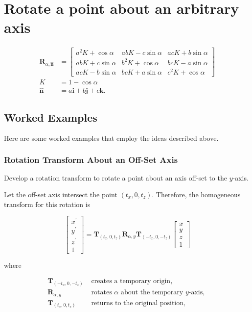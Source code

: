 \documentclass[10pt]{article}
\begin{document}
\section{Rotate a point about an arbitrary axis}
$$
\begin{aligned}
\mathbf{R}_{\alpha, \hat{\mathbf{n}}} & =\left[\begin{array}{ccc}
a^{2} K+\cos \alpha & a b K-c \sin \alpha & a c K+b \sin \alpha \\
a b K+c \sin \alpha & b^{2} K+\cos \alpha & b c K-a \sin \alpha \\
a c K-b \sin \alpha & b c K+a \sin \alpha & c^{2} K+\cos \alpha
\end{array}\right] \\
K & =1-\cos \alpha \\
\hat{\mathbf{n}} & =a \mathbf{i}+b \mathbf{j}+c \mathbf{k} .
\end{aligned}
$$

\subsection{Worked Examples}
Here are some worked examples that employ the ideas described above.

\subsubsection{Rotation Transform About an Off-Set Axis}
Develop a rotation transform to rotate a point about an axis off-set to the $y$-axis.

Let the off-set axis intersect the point $\left(t_{x}, 0, t_{z}\right)$. Therefore, the homogeneous transform for this rotation is

$$
\left[\begin{array}{c}
x^{\prime} \\
y^{\prime} \\
z^{\prime} \\
1
\end{array}\right]=\mathbf{T}_{\left(t_{x}, 0, t_{z}\right)} \mathbf{R}_{\alpha, y} \mathbf{T}_{\left(-t_{x}, 0,-t_{z}\right)}\left[\begin{array}{l}
x \\
y \\
z \\
1
\end{array}\right]
$$

where

$$
\begin{array}{cl}
\mathbf{T}_{\left(-t_{x}, 0,-t_{z}\right)} & \text { creates a temporary origin, } \\
\mathbf{R}_{\alpha, y} & \text { rotates } \alpha \text { about the temporary } y \text {-axis, } \\
\mathbf{T}_{\left(t_{x}, 0, t_{z}\right)} & \text { returns to the original position, }
\end{array}
$$
\end{document}

